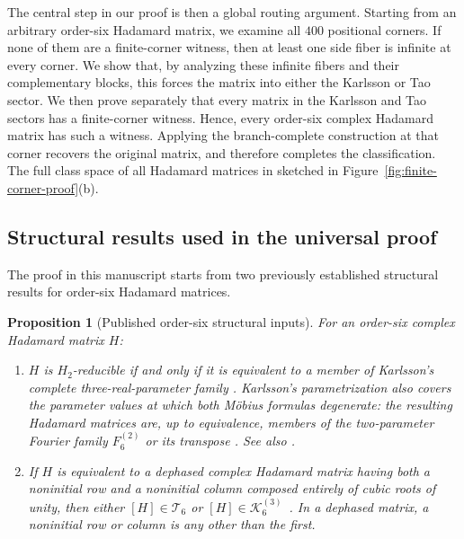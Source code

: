 \documentclass[aps,prx,reprint,nofootinbib,twoside,superscriptaddress,longbibliography,floatfix]{revtex4-2}
\newtheorem{proposition}[theorem]{Proposition}
\theoremstyle{definition}
\newcommand{\KK}{\mathcal K}
\begin{document}
The central step in our proof is then a global routing argument. Starting from an arbitrary order-six Hadamard matrix, we examine all $400$ positional corners. 
If none of them are a finite-corner witness, then at least one side fiber is infinite at every corner. We show that, by analyzing these infinite fibers and their complementary blocks, this forces the matrix into either the Karlsson or Tao sector. We then prove separately that every matrix in the Karlsson and Tao sectors has a finite-corner witness. 
Hence, every order-six complex Hadamard matrix has such a witness. Applying the branch-complete construction at that corner recovers the original matrix, and therefore completes the classification.
The full class space of all Hadamard matrices in sketched in Figure~\ref{fig:finite-corner-proof}(b).

\subsection{Structural results used in the universal proof}
The proof in this manuscript starts from two previously established structural results for order-six Hadamard matrices. 

\begin{proposition}[Published order-six structural inputs]
\label{prop:publishedinputs}
For an order-six complex Hadamard matrix $H$:
\begin{enumerate}
\item $H$ is $H_2$-reducible if and only if it is equivalent to a
member of Karlsson's complete three-real-parameter family
\cite{Karlsson2011H2,Karlsson2011ThreeParameter}. Karlsson's
parametrization also covers the parameter values at which both
M\"obius formulas degenerate: the resulting Hadamard matrices are,
up to equivalence, members of the two-parameter Fourier family
$F_6^{(2)}$ or its transpose
\cite[Secs.~4--5 and Theorem~11]{Karlsson2011ThreeParameter}.
See also
\cite[p.~623, Theorem~2.11]{Szollosi2012FourParameter}.
\item If $H$ is equivalent to a dephased complex Hadamard matrix having both a noninitial row and a noninitial column composed entirely of cubic roots of unity, then either $[H] \in \mathcal T_6$ or
$[H]\in\KK_6^{(3)}$~\cite[p.~624, Lemma~2.14]{Szollosi2012FourParameter}. 
In a dephased matrix, a noninitial row or
column is any other than the first.
\end{enumerate}
\end{proposition}
\end{document}
